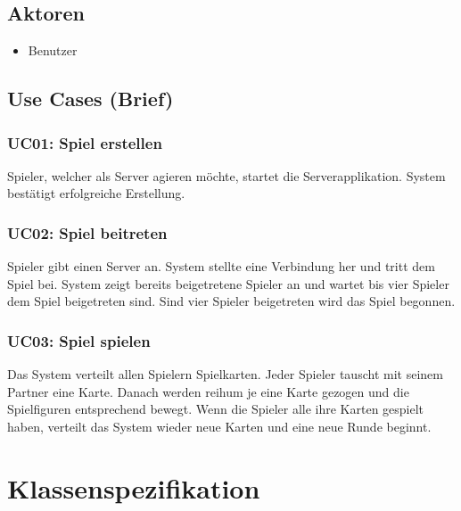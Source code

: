 \documentclass[a4paper,12pt,halfparskip,DIV14]{scrartcl}
\begin{document}
\subsection{Aktoren}\label{sec:aktoren} %
\begin{itemize}
	\item Benutzer
\end{itemize}

\subsection{Use Cases (Brief)}\label{sec:use_cases_brief_} %
\subsubsection{UC01: Spiel erstellen}\label{sub:uc01_spiel_erstellen} %
Spieler, welcher als Server agieren möchte, startet die Serverapplikation. System bestätigt erfolgreiche Erstellung.

\subsubsection{UC02: Spiel beitreten}\label{sub:uc02_spiel_beitreten} %
Spieler gibt einen Server an. System stellte eine Verbindung her und tritt dem Spiel bei. System zeigt bereits beigetretene Spieler an und wartet bis vier Spieler dem Spiel beigetreten sind. Sind vier Spieler beigetreten wird das Spiel begonnen.

\subsubsection{UC03: Spiel spielen}\label{sub:uc03_spiel_spielen} %
Das System verteilt allen Spielern Spielkarten. Jeder Spieler tauscht mit seinem Partner eine Karte. Danach werden reihum je eine Karte gezogen und die Spielfiguren entsprechend bewegt. Wenn die Spieler alle ihre Karten gespielt haben, verteilt das System wieder neue Karten und eine neue Runde beginnt. 

\section{Klassenspezifikation}\label{cha:klassenspezifikation} %
\end{document}
